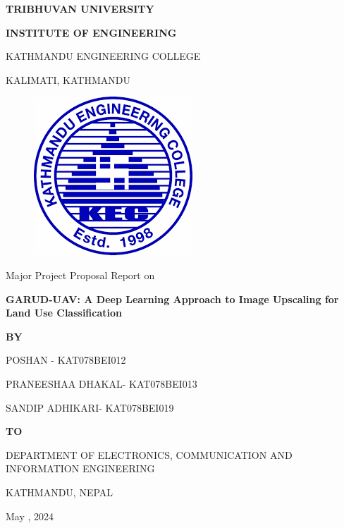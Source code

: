 \begin{titlepage}
    \thispagestyle{empty}
    \begin{center}
    
    \vspace*{\fill} %
    \vspace*{-1cm}
    {\Large \textbf{TRIBHUVAN UNIVERSITY
}\par}
{\large \textbf{INSTITUTE OF ENGINEERING
}\par}
\vspace{12pt}
KATHMANDU ENGINEERING COLLEGE

KALIMATI, KATHMANDU
\vspace{24pt}

\begin{figure}[ht]
    \centering
    \includegraphics[scale=0.45]{images/kec.png}
\end{figure}
\vspace{24pt}
{Major Project Proposal Report on\par}
\vspace{6pt}
{\textbf{GARUD-UAV: A Deep Learning Approach to Image Upscaling for Land Use Classification}\par}

\vspace{18pt}
{\textbf{BY}\par}
\vspace{10pt}
    
{POSHAN - KAT078BEI012\par}
{PRANEESHAA DHAKAL- KAT078BEI013\par}
{SANDIP ADHIKARI- KAT078BEI019\par}

\vspace{28pt}
{\textbf{TO}\par}
\vspace{10pt}
{DEPARTMENT OF ELECTRONICS, COMMUNICATION AND INFORMATION ENGINEERING\par}
{KATHMANDU, NEPAL\par}
\vspace{14pt}
{May , 2024\par}

    \vspace*{\fill}

    \end{center}
\end{titlepage}